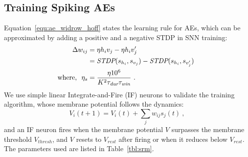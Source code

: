 \subsection[Spiking AEs]{Training Spiking AEs}
\label{subsec:exp_SAE}
Equation~\ref{equ:ae_widrow_hoff} states the learning rule for AEs, which can be approximated by adding a positive and a negative STDP in SNN training:
\begin{equation}
\label{equ:sae}
\begin{aligned}
	\Delta w_{ij} &= \eta h_i v_j - \eta h_i v'_j \\
	&= \textit{\textrm{STDP}}(s_{h_i}, s_{v_j}) - \textit{\textrm{STDP}}(s_{h_i}, s_{v'_j})~ \\
	\textrm{where,~~} \eta_{s} &=  \frac{\eta 10^6}{K^2 \tau_{\textit{\textrm{dur}}} \tau_{\textit{\textrm{win}}}}~.
\end{aligned} 
\end{equation}
We use simple linear Integrate-and-Fire (IF) neurons to validate the training algorithm, whose membrane potential follows the dynamics:
\begin{equation}
V_i(t+1)=V_i(t) + \sum_j w_{ij} s_j(t)~,
\end{equation}
and an IF neuron fires when the membrane potential $V$ surpasses the membrane threshold $V_{thresh}$, and $V$ resets to $V_{rest}$ after firing or when it reduces below $V_{rest}$.
The parameters used are listed in Table~\ref{tbl:srm}.

